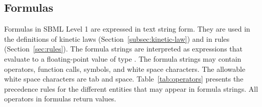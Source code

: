 \documentclass[10pt]{cekarticle}
\newcommand{\vref}[1]{\ref{#1}}
\newcommand{\changed}[1]{\textcolor{BrickRed}{#1}}
\begin{document}
\subsection{Formulas}
\label{sec:formulas}

Formulas in SBML Level 1 are expressed in text string form.  They are used
in the definitions of kinetic laws (Section~\ref{subsec:kinetic-law}) and
in rules (Section~\ref{sec:rules}).  The formula strings are interpreted as
expressions that evaluate to a floating-point value of type .
The formula strings may contain operators, function calls, symbols,
\changed{and white space characters}.  \changed{The allowable white space
  characters are tab and space.}  Table~\vref{tab:operators} presents the
precedence rules for the different entities that may appear in formula
strings.  All operators in formulas return  values.
\end{document}
